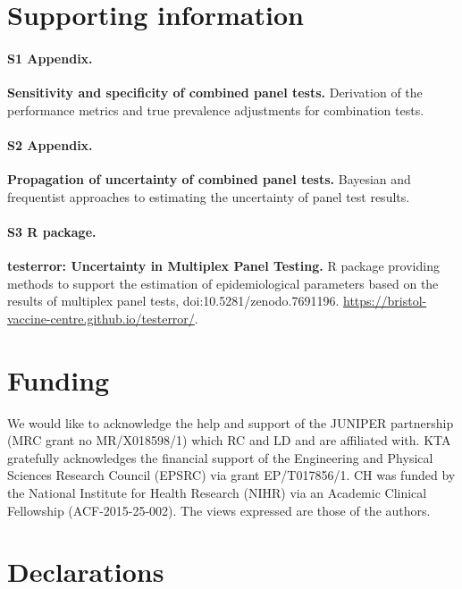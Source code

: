 \documentclass[10pt,letterpaper]{article}
\begin{document}
\section*{Supporting information}


\paragraph*{S1 Appendix.}
\label{S1_Appendix}
{\bf Sensitivity and specificity of combined panel tests.} Derivation of the performance metrics and true prevalence adjustments for combination tests.

\paragraph*{S2 Appendix.}
\label{S2_Appendix}
{\bf Propagation of uncertainty of combined panel tests.} Bayesian and frequentist approaches to estimating the uncertainty of panel test results.

\paragraph*{S3 R package.}
\label{S3_Github}
{\bf testerror: Uncertainty in Multiplex Panel Testing.}  R package providing methods to support the estimation of epidemiological parameters based on the results of multiplex panel tests, doi:10.5281/zenodo.7691196. \url{https://bristol-vaccine-centre.github.io/testerror/}.

\section*{Funding}

We would like to acknowledge the help and support of the JUNIPER partnership (MRC grant no MR/X018598/1) which RC and LD and are affiliated with. KTA gratefully acknowledges the financial support of the Engineering and Physical Sciences Research Council (EPSRC) via grant EP/T017856/1. CH was funded by the National Institute for Health Research (NIHR) via an Academic Clinical Fellowship (ACF-2015-25-002). The views expressed are those of the authors.

\section*{Declarations}
\end{document}
